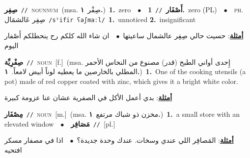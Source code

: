 \documentclass[10pt,a4paper,twoside]{article} %
\begin{document}
\begin{multicols}{2}
{\setlength\topsep{0pt}\textbf{\foreignlanguage{arabic}{صِفِر}}\ {\color{gray}\texttt{//}\color{black}}\ \textsc{noun\textunderscore num}\ \color{gray}(msa. \foreignlanguage{arabic}{صِفْر}~\foreignlanguage{arabic}{\textbf{١.}})\color{black}\ \textbf{1.}~zero\ \ $\bullet$\ \ \setlength\topsep{0pt}\textbf{\foreignlanguage{arabic}{أَصْفَار}}\ {\color{gray}\texttt{//}\color{black}}\ \textbf{1.}~zero (PL)\ \ $\bullet$\ \ \textsc{ph.} \color{gray} \foreignlanguage{arabic}{صِفِر عَالشمَال}\color{black}\ {\color{gray}\texttt{/{\sffamily sˤifir ʕaʃmaːl}/}\color{black}}\ \textbf{1.}~unnoticed  \textbf{2.}~insignificant\  \begin{flushright}\color{gray}\foreignlanguage{arabic}{\textbf{\underline{\foreignlanguage{arabic}{أمثلة}}}: حسيت حالي صِفِر عالشمال ساعيتها\ $\bullet$\ \  ان شاء الله كلكم رح ينحطلكم أَصْفار اليوم}\end{flushright}\color{black}} \vspace{2mm}

{\setlength\topsep{0pt}\textbf{\foreignlanguage{arabic}{صِفْرِيِّة}}\ {\color{gray}\texttt{//}\color{black}}\ \textsc{noun}\ [f.]\ \color{gray}(msa. \foreignlanguage{arabic}{إِحدى أواني الطبخ (قدر) مصنوع من النحاس الأحمر المطلي بالخارصين ما يعطيه لوناً أبيض لامعاً.}~\foreignlanguage{arabic}{\textbf{١.}})\color{black}\ \textbf{1.}~One of the cooking utensils (a pot) made of red copper coated with zinc, which gives it a bright white color.\  \begin{flushright}\color{gray}\foreignlanguage{arabic}{\textbf{\underline{\foreignlanguage{arabic}{أمثلة}}}: بدي أعمل الأكل في الصفرية عشان عنا عزومة كبيرة}\end{flushright}\color{black}} \vspace{2mm}

{\setlength\topsep{0pt}\textbf{\foreignlanguage{arabic}{مِصْفَار}}\ {\color{gray}\texttt{//}\color{black}}\ \textsc{noun}\ [m.]\ \color{gray}(msa. \foreignlanguage{arabic}{مخزن ذو شباك مرتفع}~\foreignlanguage{arabic}{\textbf{١.}})\color{black}\ \textbf{1.}~a small store with an elevated window\ \ $\bullet$\ \ \setlength\topsep{0pt}\textbf{\foreignlanguage{arabic}{مَصَافِر}}\ {\color{gray}\texttt{//}\color{black}}\ [pl.]\  \begin{flushright}\color{gray}\foreignlanguage{arabic}{\textbf{\underline{\foreignlanguage{arabic}{أمثلة}}}: المَصافِر اللي عندي وسخات. عندك وحدة جديدة؟\ $\bullet$\ \  اذا في مصفار مسكر افتحيه}\end{flushright}\color{black}} \vspace{2mm}


\end{multicols}
\end{document}
